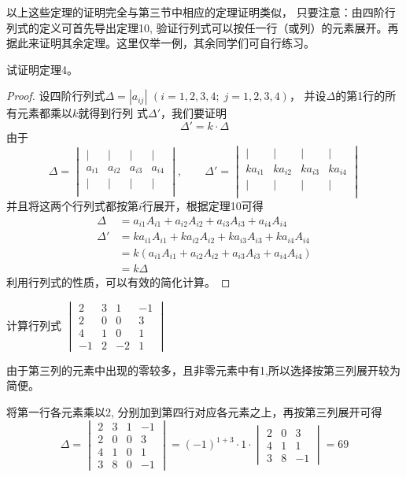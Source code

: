以上这些定理的证明完全与第三节中相应的定理证明类似，
只要注意：由四阶行列式的定义可首先导出定理10, 验证行列式可以按任一行（或列）的元素展开。再据此来证明其余定理。这里仅举一例，其余同学们可自行练习。



\begin{example}
试证明定理4。
\end{example}

\begin{proof}
    设四阶行列式$\Delta=|a_{ij}|$ $(i=1, 2, 3, 4;\; 
j=1, 2, 3, 4)$，
并设$\Delta$的第1行的所有元素都乘以$k$就得到行列
式$\Delta'$，我们要证明
\[\Delta'=k\cdot \Delta\]
由于
\[\Delta =\begin{vmatrix}
|&|&|&|\\
a_{i1}&a_{i2}&a_{i3}&a_{i4}\\
|&|&|&|\\ 
\end{vmatrix},\qquad \Delta' =\begin{vmatrix}
|&|&|&|\\
ka_{i1}&ka_{i2}&ka_{i3}&ka_{i4}\\
|&|&|&|\\ 
\end{vmatrix}\]
并且将这两个行列式都按第$i$行展开，根据定理10可得
\[\begin{split}
\Delta &= a_{i1}A_{i1}+a_{i2}A_{i2}+ a_{i3}A_{i3}+a_{i4}A_{i4} \\
\Delta'&= ka_{i1}A_{i1}+ka_{i2}A_{i2}+ ka_{i3}A_{i3}+ka_{i4}A_{i4}\\
&=k(a_{i1}A_{i1}+a_{i2}A_{i2}+ a_{i3}A_{i3}+a_{i4}A_{i4})\\
&=k\Delta
\end{split}\]
利用行列式的性质，可以有效的简化计算。
\end{proof}

\begin{example}
计算行列式
$\begin{vmatrix}
    2&3&1&-1\\2&0&0&3\\
    4&1&0&1\\-1&2&-2&1
\end{vmatrix}$
\end{example}

\begin{analyze}
由于第三列的元素中出现的零较多，且非零元素中有1,所以选择按第三列展开较为简便。
\end{analyze}

\begin{solution}
将第一行各元素乘以2, 分别加到第四行对应各元素之上，再按第三列展开可得     
\[\Delta=\begin{vmatrix}
    2&3&1&-1\\
    2&0&0&3\\
    4&1&0&1\\
    3&8&0&-1
\end{vmatrix}=(-1)^{1+3}\cdot 1\cdot \begin{vmatrix}
    2&0&3\\4&1&1\\3&8&-1
\end{vmatrix}=69\]
\end{solution}


